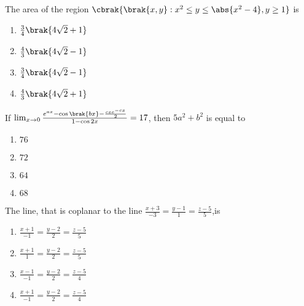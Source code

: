 
\iffalse
	\title{Assignment}
	\author{EE24BTECH11015}
	\section{mcq-single}
\fi
	\item The area of the region $\cbrak{\brak{x,y} : x^2 \leq y \leq \abs{ x^2 - 4} , y \geq 1 }$ is \hfill{}

\begin{multicols}{4}
\begin{enumerate}
\item $\frac{3}{4}\brak{4\sqrt{2}+1}$
\item $\frac{4}{3}\brak{4\sqrt{2}-1}$
\item $\frac{3}{4}\brak{4\sqrt{2}-1}$
\item $\frac{4}{3}\brak{4\sqrt{2}+1}$
\end{enumerate}
\end{multicols}

	\item If $\lim_{x \to 0} \frac{e^{ax} - \cos{\brak{bx}} - \frac{cxe^{-cx}}{2}}{1 - \cos{2x}} = 17
$, then $5a^2+b^2$ is equal to\hfill{}

\begin{multicols}{4}
\begin{enumerate}
\item $76$
\item $72$
\item $64$
\item $68$
\end{enumerate}
\end{multicols}

\item The line, that is coplanar to the line $\frac{x + 3}{-3} = \frac{y - 1}{1} = \frac{z - 5}{5}$,is\hfill{}

\begin{multicols}{4}
\begin{enumerate}
\item $\frac{x + 1}{-1} = \frac{y - 2}{2} = \frac{z - 5}{5}$
\item $\frac{x + 1}{1} = \frac{y - 2}{2} = \frac{z - 5}{5}$
\item $\frac{x - 1}{-1} = \frac{y - 2}{2} = \frac{z - 5}{4}$
\item $\frac{x + 1}{-1} = \frac{y - 2}{2} = \frac{z - 5}{4}$
\end{enumerate}
\end{multicols}

